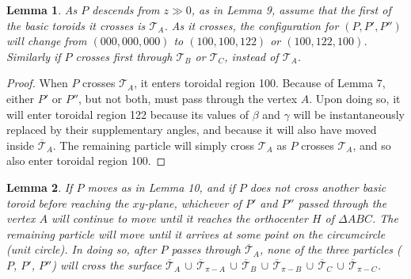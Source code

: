 \documentclass[a4paper, twoside]{article}
\newtheorem{lemma}{Lemma}
\begin{document}
\vspace{2mm}

\begin{lemma}

As $P$ descends from $z \gg 0$, as in Lemma 9, assume that the first of the basic toroids it crosses is $\mathcal{T}_A$. As it crosses, the configuration for $(P, P', P'')$ will change from $(000, 000, 000)$ to $(100, 100, 122)$ or $(100, 122, 100)$. Similarly if $P$ crosses first through $\mathcal{T}_B$ or $\mathcal{T}_C$, instead of $\mathcal{T}_A$.  \\

\end{lemma}

\begin{proof}

When $P$ crosses $\mathcal{T}_A$, it enters toroidal region 100. Because of Lemma 7, either $P'$ or $P''$, but not both, must pass through the vertex $A$. Upon doing so, it will enter toroidal region 122 because its values of $\beta$ and $\gamma$ will be instantaneously replaced by their supplementary angles, and because it will also have moved inside $\overline{\mathcal{T}}_A$. The remaining particle will simply cross $\mathcal{T}_A$ as $P$ crosses $\mathcal{T}_A$, and so also enter toroidal region 100.  

\end{proof}

\vspace{2mm}

\begin{lemma}

If $P$ moves as in Lemma 10, and if $P$ does not cross another basic toroid before reaching the $xy$-plane, whichever of $P'$ and $P''$ passed through the vertex $A$ will continue to move until it reaches the orthocenter $H$ of $\Delta ABC$. The remaining particle will move until it arrives at some point on the circumcircle (unit circle). In doing so, after $P$ passes through $\overline{\mathcal{T}}_A$, none of the three particles ($P$, $P'$, $P''$) will cross the surface $\overline{\mathcal{T}}_A \, \cup \, \overline{\mathcal{T}}_{\pi-A} \, \cup \, \overline{\mathcal{T}}_B \, \cup \, \overline{\mathcal{T}}_{\pi-B} \, \cup \, \overline{\mathcal{T}}_C \, \cup \, \overline{\mathcal{T}}_{\pi-C}$. \\ 

\end{lemma}
\end{document}
